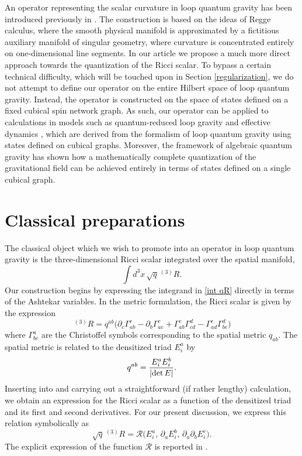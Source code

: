 \documentclass{appolb_edited}
\newcommand{\R}{{\mathscr R}}
\newcommand{\Rt}{\,{}^{(3)}\!R}
\newcommand{\de}{{\rm det}\,E}
\begin{document}
An operator representing the scalar curvature in loop quantum gravity has been introduced previously in \cite{Alesci:2014aza}. The construction is based on the ideas of Regge calculus, where the smooth physical manifold is approximated by a fictitious auxiliary manifold of singular geometry, where curvature is concentrated entirely on one-dimensional line segments. In our article \cite{Lewandowski:2021iun} we propose a much more direct approach towards the quantization of the Ricci scalar. To bypass a certain technical difficulty, which will be touched upon in Section \ref{regularization}, we do not attempt to define our operator on the entire Hilbert space of loop quantum gravity. Instead, the operator is constructed on the space of states defined on a fixed cubical spin network graph. As such, our operator can be applied to calculations in models such as quantum-reduced loop gravity \cite{Alesci:2013xd, Alesci:2016gub, Makinen:2020rda} and effective dynamics \cite{Dapor:2017rwv, Han:2019vpw, Zhang:2021qul}, which are derived from the formalism of loop quantum gravity using states defined on cubical graphs. Moreover, the framework of algebraic quantum gravity \cite{Giesel:2006uj, Giesel:2007wn} has shown how a mathematically complete quantization of the gravitational field can be achieved entirely in terms of states defined on a single cubical graph.

\section{Classical preparations}

The classical object which we wish to promote into an operator in loop quantum gravity is the three-dimensional Ricci scalar integrated over the spatial manifold, \ie
\begin{equation}
	\int d^3x\,\sqrt q\Rt.
	\label{int qR}
\end{equation}
Our construction begins by expressing the integrand in \eqref{int qR} directly in terms of the Ashtekar variables. In the metric formulation, the Ricci scalar is given by the expression
\begin{equation}
	\Rt = q^{ab}\bigl(\partial_c\Gamma^c_{ab} - \partial_b\Gamma^c_{ac} + \Gamma^c_{ab}\Gamma^d_{cd} - \Gamma^c_{ad}\Gamma^d_{bc}\bigr)
	\label{R(q)}
\end{equation}
where $\Gamma^a_{bc}$ are the Christoffel symbols corresponding to the spatial metric $q_{ab}$. The spatial metric is related to the densitized triad $E^a_i$ by
\begin{equation}
	q^{ab} = \frac{E^a_iE^b_i}{|\de|}.
	\label{q^ab}
\end{equation}
Inserting  into  and carrying out a straightforward (if rather lengthy) calculation, we obtain an expression for the Ricci scalar as a function of the densitized triad and its first and second derivatives. For our present discussion, we express this relation symbolically as
\begin{equation}
	\sqrt q\Rt = \R\bigl(E^a_i, \, \partial_aE^b_i, \, \partial_a\partial_bE^c_i\bigr).
	\label{R(E)}
\end{equation}
The explicit expression of the function $\R$ is reported in \cite{Lewandowski:2021iun}. 
\end{document}
